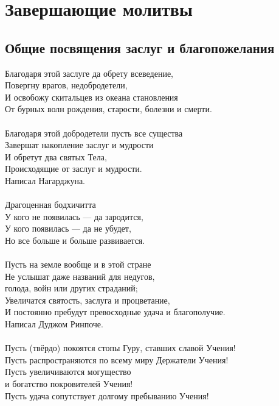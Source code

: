 
\section{Завершающие молитвы}

\subsection{Общие посвящения заслуг и благопожелания}

Благодаря этой заслуге да обрету всеведение,\\
Повергну врагов, недобродетели,\\
И освобожу скитальцев из океана становления \\
От бурных волн рождения, старости, болезни и смерти.\\
\\
Благодаря этой добродетели пусть все существа\\
Завершат накопление заслуг и мудрости \\
И обретут два святых Тела,\\
Происходящие от заслуг и мудрости.\\
\scriptsize
Написал Нагарджуна.\\
\normalsize
\\
Драгоценная бодхичитта\\
У кого не появилась — да зародится,\\
У кого появилась — да не убудет,\\
Но все больше и больше развивается.\\
\\
Пусть на земле вообще и в этой стране\\
Не услышат даже названий для недугов, \\ \indent голода, войн или других страданий;\\
Увеличатся святость, заслуга и процветание,\\
И постоянно пребудут превосходные удача и благополучие.\\
\scriptsize
Написал Дуджом Ринпоче.\\
\normalsize
\\
Пусть (твёрдо) покоятся стопы Гуру, ставших славой Учения!\\
Пусть распространяются по всему миру Держатели Учения!\\
Пусть увеличиваются могущество \\ \indent и богатство покровителей Учения!\\
Пусть удача сопутствует долгому пребыванию Учения!\\
\\

